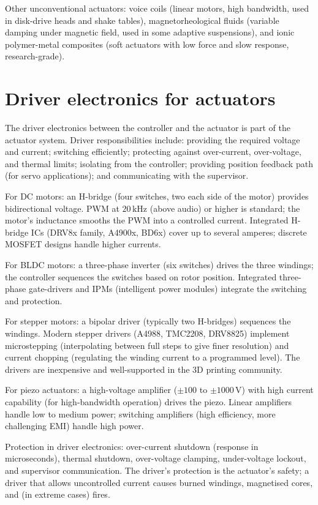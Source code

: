Other unconventional actuators: voice coils (linear motors, high bandwidth, used in disk-drive heads and shake tables), magnetorheological fluids (variable damping under magnetic field, used in some adaptive suspensions), and ionic polymer-metal composites (soft actuators with low force and slow response, research-grade).

\section{Driver electronics for actuators}

The driver electronics between the controller and the actuator is part of the actuator system. Driver responsibilities include: providing the required voltage and current; switching efficiently; protecting against over-current, over-voltage, and thermal limits; isolating from the controller; providing position feedback path (for servo applications); and communicating with the supervisor.

For DC motors: an H-bridge (four switches, two each side of the motor) provides bidirectional voltage. PWM at $20\,\text{kHz}$ (above audio) or higher is standard; the motor's inductance smooths the PWM into a controlled current. Integrated H-bridge ICs (DRV8x family, A4900x, BD6x) cover up to several amperes; discrete MOSFET designs handle higher currents.

For BLDC motors: a three-phase inverter (six switches) drives the three windings; the controller sequences the switches based on rotor position. Integrated three-phase gate-drivers and IPMs (intelligent power modules) integrate the switching and protection.

For stepper motors: a bipolar driver (typically two H-bridges) sequences the windings. Modern stepper drivers (A4988, TMC2208, DRV8825) implement microstepping (interpolating between full steps to give finer resolution) and current chopping (regulating the winding current to a programmed level). The drivers are inexpensive and well-supported in the $3$D printing community.

For piezo actuators: a high-voltage amplifier ($\pm 100$ to $\pm 1000\,\text{V}$) with high current capability (for high-bandwidth operation) drives the piezo. Linear amplifiers handle low to medium power; switching amplifiers (high efficiency, more challenging EMI) handle high power.

Protection in driver electronics: over-current shutdown (response in microseconds), thermal shutdown, over-voltage clamping, under-voltage lockout, and supervisor communication. The driver's protection is the actuator's safety; a driver that allows uncontrolled current causes burned windings, magnetised cores, and (in extreme cases) fires.

